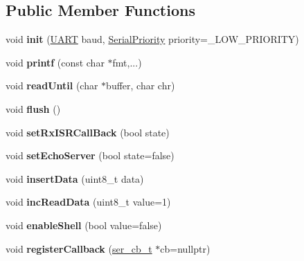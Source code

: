 \subsection*{Public Member Functions}
\begin{DoxyCompactItemize}
\item 
\mbox{\label{classSerial_ab84837438196db931f7cb9f73f14a343}} 
void {\bfseries init} (\hyperlink{serial_8h_a6f88b8988ee3bab3eaaa301212c7f804}{U\+A\+RT} baud, \hyperlink{serial_8h_aa8b6628780447bd68953ca27d2f1acd8}{Serial\+Priority} priority=\+\_\+\+L\+O\+W\+\_\+\+P\+R\+I\+O\+R\+I\+TY)
\item 
\mbox{\label{classSerial_a4c0b18b5cff99f166aed20fa8295ccf9}} 
void {\bfseries printf} (const char $\ast$fmt,...)
\item 
\mbox{\label{classSerial_aba74e314aa15524ce7cd49306accc666}} 
void {\bfseries read\+Until} (char $\ast$buffer, char chr)
\item 
\mbox{\label{classSerial_a63b7abf172cad25bfc998b3b1f98310f}} 
void {\bfseries flush} ()
\item 
\mbox{\label{classSerial_aac4dc5a6eb54ac09c3813684295f00f4}} 
void {\bfseries set\+Rx\+I\+S\+R\+Call\+Back} (bool state)
\item 
\mbox{\label{classSerial_aca6f48464bb0a4828177f0c70111a36a}} 
void {\bfseries set\+Echo\+Server} (bool state=false)
\item 
\mbox{\label{classSerial_ad805c3cc6c46156d640f34eac1585d4a}} 
void {\bfseries insert\+Data} (uint8\+\_\+t data)
\item 
\mbox{\label{classSerial_a54041d1af51695205e804dfc911983da}} 
void {\bfseries inc\+Read\+Data} (uint8\+\_\+t value=1)
\item 
\mbox{\label{classSerial_ab8ff24beb4593dd912b8091099a6ebd4}} 
void {\bfseries enable\+Shell} (bool value=false)
\item 
\mbox{\label{classSerial_a2e870d7b7fcab20cc2d2fb70ad73764d}} 
void {\bfseries register\+Callback} (\hyperlink{serial_8h_ae45e33beead6f4d4d7ec9ce44c4bcc83}{ser\+\_\+cb\+\_\+t} $\ast$cb=nullptr)

\end{DoxyCompactItemize}
